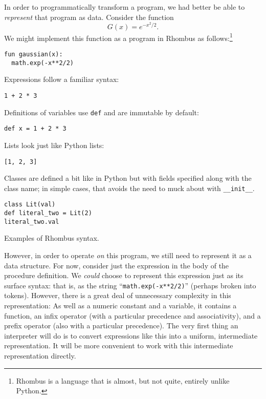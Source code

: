 \documentclass[11pt, a4paper]{article}
\newcommand{\cd}[1]{\texttt{#1}}
\begin{document}
In order to programmatically transform a program, we had better be
able to \emph{represent} that program as data. Consider the function
\begin{equation}
  \label{eq:gaussian-example}
  G(x) = e^{-x^2/2}.
\end{equation}
We might implement this function as a program in Rhombus
as follows:\footnote{Rhombus is a language that is almost, but not quite,
  entirely unlike Python.}
\begin{verbatim}
fun gaussian(x):
  math.exp(-x**2/2)
\end{verbatim}
\begin{marginfigure}\footnotesize
  Expressions follow a familiar syntax:
\begin{verbatim}
1 + 2 * 3
\end{verbatim}
  Definitions of variables use \cd{def} and are immutable by default:
\begin{verbatim}
def x = 1 + 2 * 3
\end{verbatim}
  Lists look just like Python lists:
\begin{verbatim}
[1, 2, 3]
\end{verbatim}
  Classes are defined a bit like in Python but with fields specified
  along with the class name; in simple cases, that avoids the need to
  muck about with \cd{__init__}.
\begin{verbatim}
class Lit(val)
def literal_two = Lit(2)
literal_two.val 
\end{verbatim}
  \caption{Examples of Rhombus syntax.}
\end{marginfigure}
However, in order to operate \emph{on} this program, we still need to
represent it as a data structure. For now, consider just the
expression in the body of the procedure definition. We \emph{could}
choose to represent this expression just as its surface syntax: that
is, as the string ``\cd{math.exp(-x**2/2)}'' (perhaps broken into
tokens). However, there is a great deal of unnecessary complexity in
this representation: As well as a numeric constant and a variable, it
contains a function, an infix operator (with a particular precedence
and associativity), and a prefix operator (also with a particular
precedence). The very first thing an interpreter will do is to convert
expressions like this into a uniform, intermediate representation. It
will be more convenient to work with this intermediate representation
directly.
\end{document}
